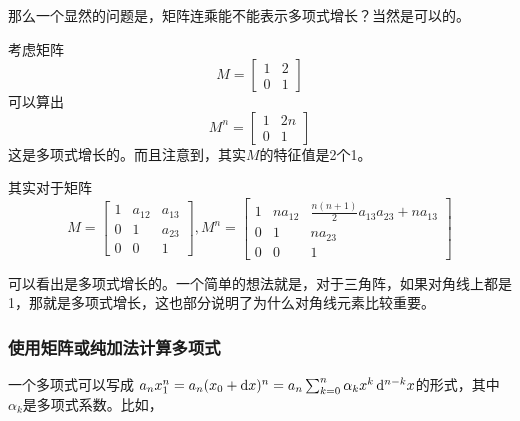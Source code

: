 那么一个显然的问题是，矩阵连乘能不能表示多项式增长？当然是可以的。

考虑矩阵
\[M=\begin{bmatrix}
	1 & 2\\
	0 & 1
\end{bmatrix}\]
可以算出
\[M^n=\begin{bmatrix}
	1 & 2n\\
	0 & 1
\end{bmatrix}\]
这是多项式增长的。而且注意到，其实$M$的特征值是2个1。

其实对于矩阵
\[
M=\begin{bmatrix}
1& a_{12} & a_{13}\\
0& 1 & a_{23}\\
0&0&1
\end{bmatrix},M^n=\begin{bmatrix}
1& na_{12} & \frac{n(n+1)}{2}a_{13}a_{23}+na_{13}\\
0& 1 & na_{23}\\
0&0&1
\end{bmatrix}
\]

可以看出是多项式增长的。一个简单的想法就是，对于三角阵，如果对角线上都是1，那就是多项式增长，这也部分说明了为什么对角线元素比较重要。

\subsubsection{使用矩阵或纯加法计算多项式}
一个多项式可以写成 $a_nx_1^n=a_n(x_0+\mathop{}\!\mathrm{d} x)^n=a_n\sum_{k=0}^{n }\alpha_k x^k\mathop{}\!\mathrm{d}^{n-k}x$的形式，其中$\alpha_k$是多项式系数。比如，


